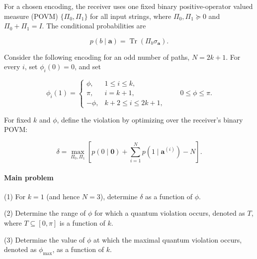 For a chosen encoding, the receiver uses one fixed binary positive-operator
valued measure (POVM) $\{\Pi_0,\Pi_1\}$ for all input strings, where
$\Pi_0,\Pi_1\succeq0$ and $\Pi_0+\Pi_1=I$. The conditional probabilities are

\[
p(b\mid\mathbf a)=\operatorname{Tr}(\Pi_b\sigma_{\mathbf a}).
\]

Consider the following encoding for an odd number of paths,
$N=2k+1$. For every $i$, set $\phi_i(0)=0$, and set

\[
\phi_i(1)=
\begin{cases}
\phi, & 1\leq i\leq k,\\
\pi, & i=k+1,\\
-\phi, & k+2\leq i\leq 2k+1,
\end{cases}
\qquad 0\leq\phi\leq\pi.
\]

For fixed $k$ and $\phi$, define the violation by optimizing
over the receiver's binary POVM:

\[
\delta
=\max_{\Pi_0,\Pi_1}
\left[
p(0\mid\mathbf0)
+\sum_{i=1}^N p(1\mid\mathbf a^{(i)})-N
\right].
\]

\paragraph*{Main problem}

(1) For $k=1$ (and hence $N=3$), determine $\delta$ as a
function of $\phi$.

(2) Determine the range of $\phi$ for which a quantum violation occurs, denoted as $T$, where $T \subseteq [0, \pi]$ is a function of $k$.

(3) Determine the value of $\phi$ at which the maximal quantum violation occurs, denoted as $\phi_{\max}$, as a function of $k$.